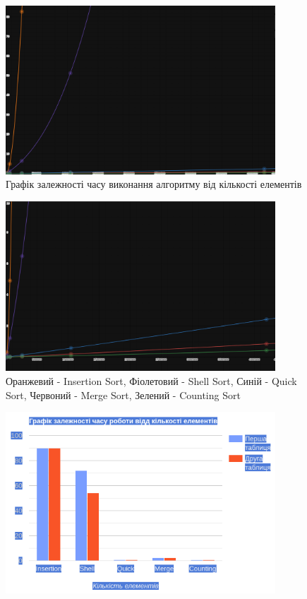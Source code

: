 \documentclass[12pt]{extarticle}
\begin{document}
\vspace{12pt}
\begin{figure}[H]
    \centering
    \includegraphics[width=0.90\textwidth]{graph1.png}
    \caption{Графік залежності часу виконання алгоритму від кількості елементів}
\end{figure}
\begin{figure}[H]
    \centering
    \includegraphics[width=0.90\textwidth]{graph2.png}
    \caption{Оранжевий - Insertion Sort, 
    Фіолетовий - Shell Sort, 
    Синій - Quick Sort, 
    Червоний - Merge Sort,
    Зелений - Counting Sort}
\end{figure}
\begin{figure}[H]
    \centering
    \includegraphics[width=0.90\textwidth]{graph3.png}
\end{figure}
\end{document}

